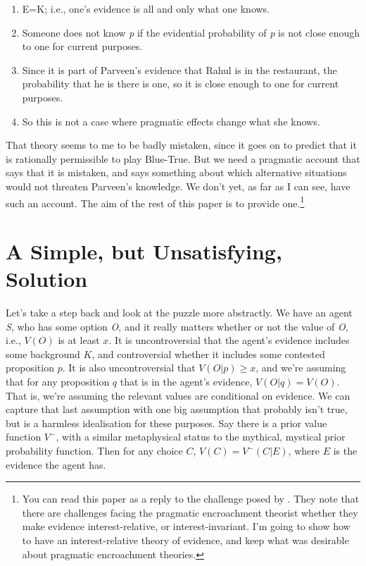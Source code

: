 \documentclass{article}
\begin{document}
\begin{enumerate}
\item E=K; i.e., one's evidence is all and only what one knows.

\item Someone does not know \emph{p} if the evidential probability of \emph{p} is not close enough to one for current purposes.

\item Since it is part of Parveen's evidence that Rahul is in the restaurant, the probability that he is there is one, so it is close enough to one for current purposes.

\item So this is not a case where pragmatic effects change what she knows.

\end{enumerate}
That theory seems to me to be badly mistaken, since it goes on to predict that it is rationally permissible to play Blue-True. But we need a pragmatic account that says that it is mistaken, and says something about which alternative situations would not threaten Parveen's knowledge. We don't yet, as far as I can see, have such an account. The aim of the rest of this paper is to provide one.\footnote{You can read this paper as a reply to the challenge posed by \citet{IchikawaEtAl2012}. They note that there are challenges facing the pragmatic encroachment theorist whether they make evidence interest-relative, or interest-invariant. I'm going to show how to have an interest-relative theory of evidence, and keep what was desirable about pragmatic encroachment theories.}

\section{A Simple, but Unsatisfying, Solution}
\label{asimplebutunsatisfyingsolution}

Let's take a step back and look at the puzzle more abstractly. We have an agent \emph{S}, who has some option \emph{O}, and it really matters whether or not the value of \emph{O}, i.e., $V(O)$ is at least $x$. It is uncontroversial that the agent's evidence includes some background $K$, and controversial whether it includes some contested proposition $p$. It is also uncontroversial that $V(O | p) \geq x$, and we're assuming that for any proposition $q$ that is in the agent's evidence, $V(O | q) = V(O)$. That is, we're assuming the relevant values are conditional on evidence. We can capture that last assumption with one big assumption that probably isn't true, but is a harmless idealisation for these purposes. Say there is a prior value function $V^-$, with a similar metaphysical status to the mythical, mystical prior probability function. Then for any choice $C$, $V(C) = V^-(C | E)$, where $E$ is the evidence the agent has.
\end{document}

